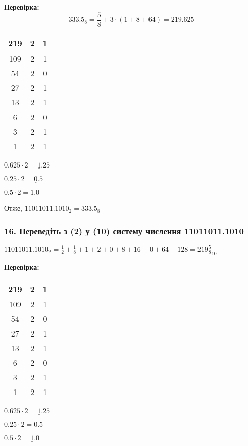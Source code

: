 \documentclass[14pt]{extreport}
\begin{document}
\textbf{Перевірка:}
$$333.5_8=\frac{5}{8}+3\cdot(1+8+64)=219.625$$

\begin{multicols}{2}
\begin{tabular}{c|c|c}
	219 & 2 & 1 \\
	\hline
	109 & 2 & 1 \\
	\hline
	54 & 2 & 0 \\
	\hline
	27 & 2 & 1 \\
	\hline
	13 & 2 & 1 \\
	\hline
	6 & 2 & 0 \\
	\hline
	3 & 2 & 1 \\
	\hline
	1 & 2 & 1 \\
\end{tabular}

$0.625\cdot2=\underline{1}.25$

$0.25\cdot2=\underline{0}.5$

$0.5\cdot2=\underline{1}.0$

\bigskip
Отже,
$11011011.1010_2=333.5_8$

\end{multicols}
\bigskip

\subsubsection{16. Переведіть з (2) у (10) систему числення 11011011.1010}
$11011011.1010_2=\frac{1}{2}+\frac{1}{8}+
1+2+0+8+16+0+64+128=219\frac{5}{8}_{10}$

\bigskip
\textbf{Перевірка:}
\bigskip
\begin{multicols}{2}
\begin{tabular}{c|c|c}
	219 & 2 & 1 \\
	\hline
	109 & 2 & 1 \\
	\hline
	54 & 2 & 0 \\
	\hline
	27 & 2 & 1 \\
	\hline
	13 & 2 & 1 \\
	\hline
	6 & 2 & 0 \\
	\hline
	3 & 2 & 1 \\
	\hline
	1 & 2 & 1 \\
\end{tabular}

$0.625\cdot2=\underline{1}.25$

$0.25\cdot2=\underline{0}.5$

$0.5\cdot2=\underline{1}.0$

\end{multicols}
\end{document}
